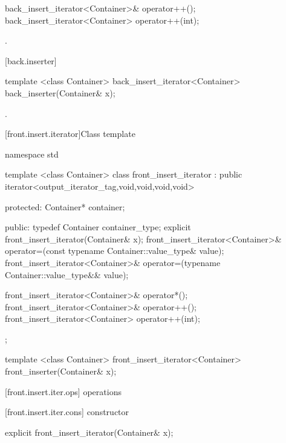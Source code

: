 %
\begin{itemdecl}
back_insert_iterator<Container>& operator++();
back_insert_iterator<Container>  operator++(int);
\end{itemdecl}

\begin{itemdescr}
\pnum
\returns
{}.
\end{itemdescr}

[back.inserter]{ }

%
\begin{itemdecl}
template <class Container>
  back_insert_iterator<Container> back_inserter(Container& x);
\end{itemdecl}

\begin{itemdescr}
\pnum
\returns
{}.
\end{itemdescr}

[front.insert.iterator]{Class template }

%
\begin{codeblock}
namespace std {
  template <class Container>
  class front_insert_iterator :
    public iterator<output_iterator_tag,void,void,void,void> {
  protected:
    Container* container;

  public:
    typedef Container container_type;
    explicit front_insert_iterator(Container& x);
    front_insert_iterator<Container>&
      operator=(const typename Container::value_type& value);
    front_insert_iterator<Container>&
      operator=(typename Container::value_type&& value);

    front_insert_iterator<Container>& operator*();
    front_insert_iterator<Container>& operator++();
    front_insert_iterator<Container>  operator++(int);
  };

  template <class Container>
    front_insert_iterator<Container> front_inserter(Container& x);
}
\end{codeblock}

[front.insert.iter.ops]{ operations}

[front.insert.iter.cons]{ constructor}

%
\begin{itemdecl}
explicit front_insert_iterator(Container& x);
\end{itemdecl}


